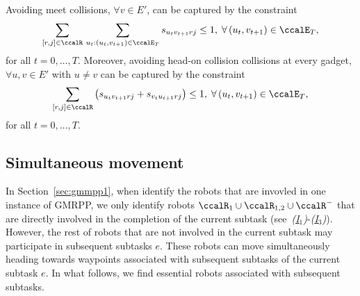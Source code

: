 \documentclass[Afour,sageh,times]{sagej}
\begin{document}
{{Avoiding meet collisions,  $\forall v \in E'$, can be captured by the constraint
\begingroup\makeatletter\def\f@size{10}\check@mathfonts
\def\maketag@@@#1{\hbox{\m@th\normalsize\normalfont#1}}%
\begin{align}\label{eq:meet}
 \sum_{[r,j]\in\ccalR}  \, \sum_{u_t: (u_t, v_{t+1}) \in \ccalE_T} s_{u_t v_{t+1} r j } \leq 1,  \; \forall \,(u_t, v_{t+1}) \in \ccalE_T,
\end{align}
\endgroup
for all $t=0,\ldots,T$. Moreover, avoiding head-on collision collisions at every  gadget, $\forall u, v \in E'$ with $u\not= v$ can be captured by the constraint
\begingroup\makeatletter\def\f@size{10}\check@mathfonts
\def\maketag@@@#1{\hbox{\m@th\normalsize\normalfont#1}}%
\begingroup
\begin{align}\label{eq:headon}
 \sum_{[r,j]\in \ccalR} \left( s_{u_t v_{t+1} r j } + s_{v_t u_{t+1} r j } \right) \leq 1, \; \forall \,(u_t, v_{t+1}) \in \ccalE_T,
\end{align}
\endgroup
for all $t=0,\ldots,T$.

\subsection{Simultaneous movement}\label{sec:extension_essential}
In Section~\ref{sec:gmmpp1}, when identify the robots that are invovled in one instance of GMRPP, we only identify robots $\ccalR_1 \cup \ccalR_{1,2} \cup \ccalR^-$ that are directly involved in the completion of the current subtask (see~{\it (\hyperref[sec:essential_a]{I$_1$})}-{\it (\hyperref[sec:essential_c]{I$_3$})}). However, the rest of robots that are not involved in the current subtask may participate in subsequent subtasks $e$. These robots can move simultaneously  heading towards  waypoints associated with subsequent subtasks of the current subtask $e$. In what follows, we find essential robots associated with subsequent subtasks.

}}
\end{document}
